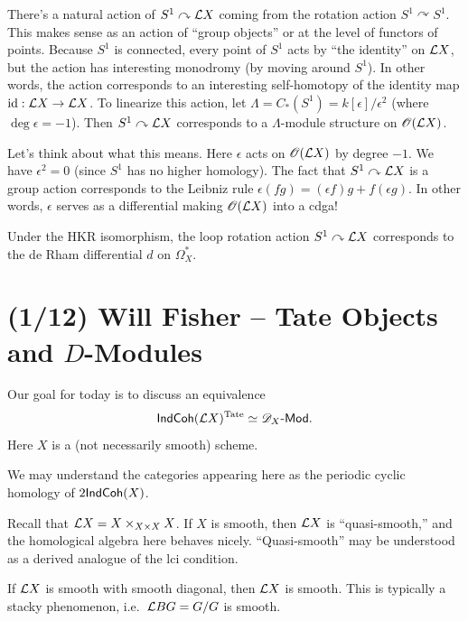 \documentclass{article}
\begin{document}
There's a natural action of $S^1 \curvearrowright \mathcal{L} X$ coming from the rotation action $S^1 \curvearrowright S^1$.
This makes sense as an action of ``group objects'' or at the level of functors of points.
Because $S^1$ is connected, every point of $S^1$ acts by ``the identity'' on $\mathcal{L} X$, but the action has interesting monodromy (by moving around $S^1$).
In other words, the action corresponds to an interesting self-homotopy of the identity map $\operatorname{id}: \mathcal{L} X \to \mathcal{L} X$.
To linearize this action, let $\Lambda = C_*(S^1) = k[\epsilon] / \epsilon^2$ (where $\deg \epsilon = -1$).
Then $S^1 \curvearrowright \mathcal{L} X$ corresponds to a $\Lambda$-module structure on $\mathscr{O}(\mathcal{L} X)$.

Let's think about what this means.
Here $\epsilon$ acts on $\mathscr{O}(\mathcal{L} X)$ by degree $-1$.
We have $\epsilon^2 = 0$ (since $S^1$ has no higher homology).
The fact that $S^1 \curvearrowright \mathcal{L} X$ is a group action corresponds to the Leibniz rule $\epsilon (fg) = (\epsilon f) g + f (\epsilon g)$.
In other words, $\epsilon$ serves as a differential making $\mathscr{O}(\mathcal{L} X)$ into a cdga!

\begin{thm}
  Under the HKR isomorphism, the loop rotation action $S^1 \curvearrowright \mathcal{L} X$ corresponds to the de Rham differential $d$ on $\Omega^*_X$.
\end{thm}

\section{(1/12) Will Fisher -- Tate Objects and $D$-Modules}

Our goal for today is to discuss an equivalence
\[
  \mathsf{IndCoh}(\mathcal{L} X)^{\mathrm{Tate}} \simeq \mathscr{D}_X\text{-}\mathsf{Mod}.
\]
Here $X$ is a (not necessarily smooth) scheme.

\begin{rmk}
  We may understand the categories appearing here as the periodic cyclic homology of $2\mathsf{IndCoh}(X)$.
\end{rmk}

\begin{rmk}
  Recall that $\mathcal{L} X = X \times_{X \times X} X$.
  If $X$ is smooth, then $\mathcal{L} X$ is ``quasi-smooth,'' and the homological algebra here behaves nicely.
  ``Quasi-smooth'' may be understood as a derived analogue of the lci condition.

  If $\mathcal{L} X$ is smooth with smooth diagonal, then $\mathcal{L} X$ is smooth.
  This is typically a stacky phenomenon, i.e.\ $\mathcal{L} BG = G / G$ is smooth.
\end{rmk}
\end{document}
